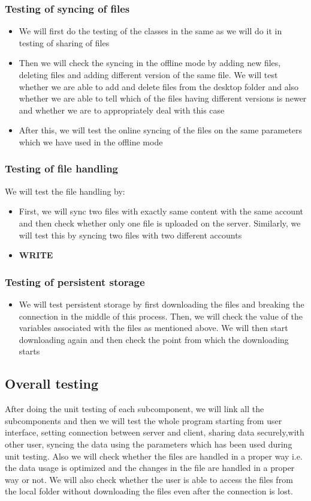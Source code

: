 \documentclass{article}
\begin{document}
			\subsubsection{Testing of syncing of files}
				\begin{itemize}
					\item We will first do the testing of the classes in the same as we will do it in testing of sharing of files
					\item Then we will check the syncing in the offline mode by adding new files, deleting files and adding different version of the same file. We will test whether we are able to add and delete files from the desktop folder  and also whether we are able to tell which of the files having different versions is newer and whether we are to appropriately deal with this case
					\item After this, we will test the online syncing of the files on the same parameters which we have used in the offline mode
				\end{itemize}
			\subsubsection{Testing of file handling}
				We will test the file handling by:
				\begin{itemize}
					\item First, we will sync two files with exactly same content with the same account and then check whether only one file is uploaded on the server. Similarly, we will test this by syncing two files with two different accounts
					\item \textbf{WRITE}
				\end{itemize}
			\subsubsection{Testing of persistent storage}
				\begin{itemize}
					\item We will test persistent storage by first downloading the files and breaking the connection in the middle of this process. Then, we will check the value of the variables associated with the files as mentioned above. We will then start downloading again and then check the point from which the downloading starts
				\end{itemize}
		\subsection{Overall testing}
			After doing the unit testing of each subcomponent, we will link all the subcomponents and then we will test the whole program starting from user interface, setting connection between server and client, sharing data securely,with other user, syncing the data using the parameters which has been used during unit testing. Also we will check whether the files are handled in a proper way i.e. the data usage is optimized and the changes in the file are handled in a proper way or not. We will also check whether the user is able to access the files from the local folder without downloading the files even after the connection is lost.
\end{document}
